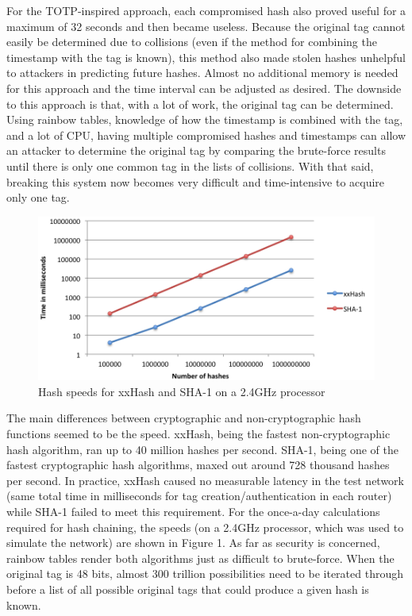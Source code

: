 \documentclass[12pt]{article} %
\begin{document}
For the TOTP-inspired approach, each compromised hash also proved useful for a maximum of 32 seconds and then became useless. Because the original tag cannot easily be determined due to collisions (even if the method for combining the timestamp with the tag is known), this method also made stolen hashes unhelpful to attackers in predicting future hashes. Almost no additional memory is needed for this approach and the time interval can be adjusted as desired. The downside to this approach is that, with a lot of work, the original tag can be determined. Using rainbow tables, knowledge of how the timestamp is combined with the tag, and a lot of CPU, having multiple compromised hashes and timestamps can allow an attacker to determine the original tag by comparing the brute-force results until there is only one common tag in the lists of collisions. With that said, breaking this system now becomes very difficult and time-intensive to acquire only one tag.

\begin{figure}[ht!]
\includegraphics[width=160mm]{hashspeeds.png}
\caption{Hash speeds for xxHash and SHA-1 on a 2.4GHz processor}
\end{figure}

The main differences between cryptographic and non-cryptographic hash functions seemed to be the speed. xxHash, being the fastest non-cryptographic hash algorithm, ran up to 40 million hashes per second. SHA-1, being one of the fastest cryptographic hash algorithms, maxed out around 728 thousand hashes per second. In practice, xxHash caused no measurable latency in the test network (same total time in milliseconds for tag creation/authentication in each router) while SHA-1 failed to meet this requirement. For the once-a-day calculations required for hash chaining, the speeds (on a 2.4GHz processor, which was used to simulate the network) are shown in Figure 1. As far as security is concerned, rainbow tables render both algorithms just as difficult to brute-force. When the original tag is 48 bits, almost 300 trillion possibilities need to be iterated through before a list of all possible original tags that could produce a given hash is known.
\end{document}
